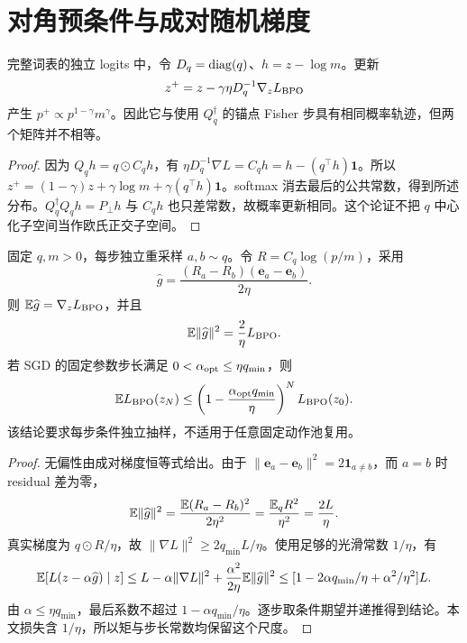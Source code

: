 \section{对角预条件与成对随机梯度}
\begin{proposition}[对角预条件恢复同一概率更新]
\label{prop:bpo-diagonal}
完整词表的独立 logits 中，令 $D_q=\operatorname{diag}(q)$、$h=z-\log m$。更新
\begin{equation}
z^+=z-\gamma\eta D_q^{-1}\nabla_zL_{\rm BPO}
\end{equation}
产生 $p^+\propto p^{1-\gamma}m^\gamma$。因此它与使用 $Q_q^\dagger$ 的锚点 Fisher 步具有相同概率轨迹，但两个矩阵并不相等。
\end{proposition}
\begin{proof}
因为 $Q_qh=q\odot C_qh$，有 $\eta D_q^{-1}\nabla L=C_qh=h-(q^\top h)\mathbf1$。所以 $z^+=(1-\gamma)z+\gamma\log m+\gamma(q^\top h)\mathbf1$。softmax 消去最后的公共常数，得到所述分布。$Q_q^\dagger Q_qh=P_\perp h$ 与 $C_qh$ 也只差常数，故概率更新相同。这个论证不把 $q$ 中心化子空间当作欧氏正交子空间。
\end{proof}

\begin{theorem}
\label{thm:pair-sgd}
固定 $q,m>0$，每步独立重采样 $a,b\sim q$。令 $R=C_q\log(p/m)$，采用
\begin{equation}
\widehat g=\frac{(R_a-R_b)(\mathbf e_a-\mathbf e_b)}{2\eta}.
\end{equation}
则 $\mathbb E\widehat g=\nabla_zL_{\rm BPO}$，并且
\begin{equation}
\mathbb E\|\widehat g\|^2=\frac{2}{\eta}L_{\rm BPO}.
\end{equation}
若 SGD 的固定参数步长满足 $0<\alpha_{\rm opt}\le\eta q_{\min}$，则
\begin{equation}
\mathbb E L_{\rm BPO}(z_N)\le
\left(1-\frac{\alpha_{\rm opt}q_{\min}}{\eta}\right)^N L_{\rm BPO}(z_0).
\end{equation}
该结论要求每步条件独立抽样，不适用于任意固定动作池复用。
\end{theorem}
\begin{proof}
无偏性由成对梯度恒等式给出。由于 $\|\mathbf e_a-\mathbf e_b\|^2=2\mathbf1_{a\ne b}$，而 $a=b$ 时 residual 差为零，
\begin{equation}
\mathbb E\|\widehat g\|^2
=\frac{\mathbb E(R_a-R_b)^2}{2\eta^2}
=\frac{\mathbb E_qR^2}{\eta^2}=\frac{2L}{\eta}.
\end{equation}
真实梯度为 $q\odot R/\eta$，故 $\|\nabla L\|^2\ge2q_{\min}L/\eta$。使用足够的光滑常数 $1/\eta$，有
\begin{equation}
\mathbb E[L(z-\alpha\widehat g)\mid z]
\le L-\alpha\|\nabla L\|^2+\frac{\alpha^2}{2\eta}\mathbb E\|\widehat g\|^2
\le[1-2\alpha q_{\min}/\eta+\alpha^2/\eta^2]L.
\end{equation}
由 $\alpha\le\eta q_{\min}$，最后系数不超过 $1-\alpha q_{\min}/\eta$。逐步取条件期望并递推得到结论。本文损失含 $1/\eta$，所以矩与步长常数均保留这个尺度。
\end{proof}

